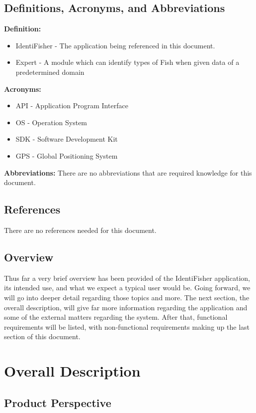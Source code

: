\documentclass{article}
\begin{document}
\subsection{Definitions, Acronyms, and Abbreviations}

\textbf{Definition:}

\begin{itemize}
	\item IdentiFisher - The application being referenced in this document.
	\item Expert - A module which can identify types of Fish when given data of a predetermined domain
\end{itemize}
\textbf{Acronyms:}

\begin{itemize}
	\item API - Application Program Interface
	\item OS - Operation System
	\item SDK - Software Development Kit
	\item GPS - Global Positioning System
\end{itemize}
\textbf{Abbreviations:}
There are no abbreviations that are required knowledge for this document.

\subsection{References}
There are no references needed for this document.

\subsection{Overview}
Thus far a very brief overview has been provided of the IdentiFisher application, its intended
use, and what we expect a typical user would be. Going forward, we will go into deeper detail
regarding those topics and more. The next section, the overall description, will give far more information regarding
the application and some of the external matters regarding the system. After that, functional
requirements will be listed, with non-functional requirements making up the last section of this document.

\section{Overall Description}

\subsection{Product Perspective}
\end{document}
